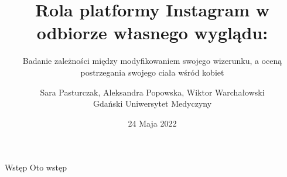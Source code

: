 \documentclass[pdf]{beamer}
\title{Rola platformy Instagram w odbiorze własnego wyglądu:}
\subtitle{Badanie zależności między modyfikowaniem swojego wizerunku, a oceną postrzegania swojego ciała wśród kobiet}
\author{Sara Pasturczak, Aleksandra Popowska, Wiktor Warchałowski\\
Gdański Uniwersytet Medyczyny}
\date{24 Maja 2022}
\begin{document}
\begin{frame}
  \titlepage
\end{frame}

\begin{frame}{Wstęp}
  Oto wstęp
\end{frame}
\end{document}
